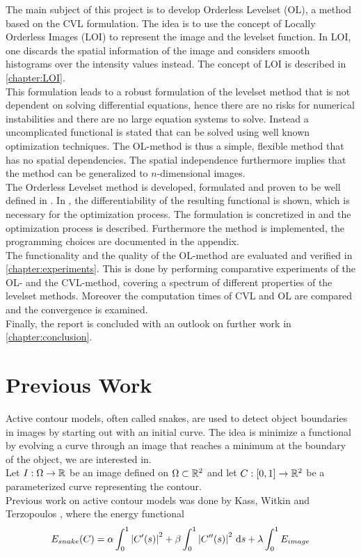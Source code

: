 The main subject of this project is to develop Orderless Levelset (OL), a method based on the CVL formulation. The idea is to use the concept of Locally Orderless Images (LOI) to represent the image and the levelset function. In LOI, one discards the spatial information of the image and considers smooth histograms over the intensity values instead. The concept of LOI is described in \cref{chapter:LOI}.\\
This formulation leads to a robust formulation of the levelset method that is not dependent on solving differential equations, hence there are no risks for numerical instabilities and there are no large equation systems to solve. Instead a uncomplicated functional is stated that can be solved using well known optimization techniques. The OL-method is thus a simple, flexible method that has no spatial dependencies. The spatial independence furthermore implies that the method can be generalized to $n$-dimensional images.\\
The Orderless Levelset method is developed, formulated and proven to be well defined in . In , the differentiability of the resulting functional is shown, which is necessary for the optimization process. The formulation is concretized in  and the optimization process is described. Furthermore the method is implemented, the programming choices are documented in the appendix.\\

The functionality and the quality of the OL-method are evaluated and verified in \cref{chapter:experiments}. This is done by performing comparative experiments of the OL- and the CVL-method, covering a spectrum of different properties of the levelset methods. Moreover the computation times of CVL and OL are compared and the convergence is examined.\\
Finally, the report is concluded with an outlook on further work in \cref{chapter:conclusion}.

\section{Previous Work}

Active contour models, often called snakes, are used to detect object boundaries in images by starting out with an initial curve. The idea is minimize a functional by evolving a curve through an image that reaches a minimum at the boundary of the object, we are interested in.\\
Let $I:\Omega\to \mathbb R$ be an image defined on $\Omega\subset\mathbb R^2$ and let $C:[0,1]\to\mathbb R^2$ be a parameterized curve representing the contour.\\
Previous work on active contour models was done by Kass, Witkin and Terzopoulos \cite{kass.88}, where the energy functional
\begin{equation}
  E_{snake}(C) = \alpha\int_0^1 \left| {C'(s)} \right|^2  + \beta\int_0^1 \left| {C''(s)} \right|^2\,{\rm d} s + \lambda\int_0^1 E_{image}
\end{equation}

